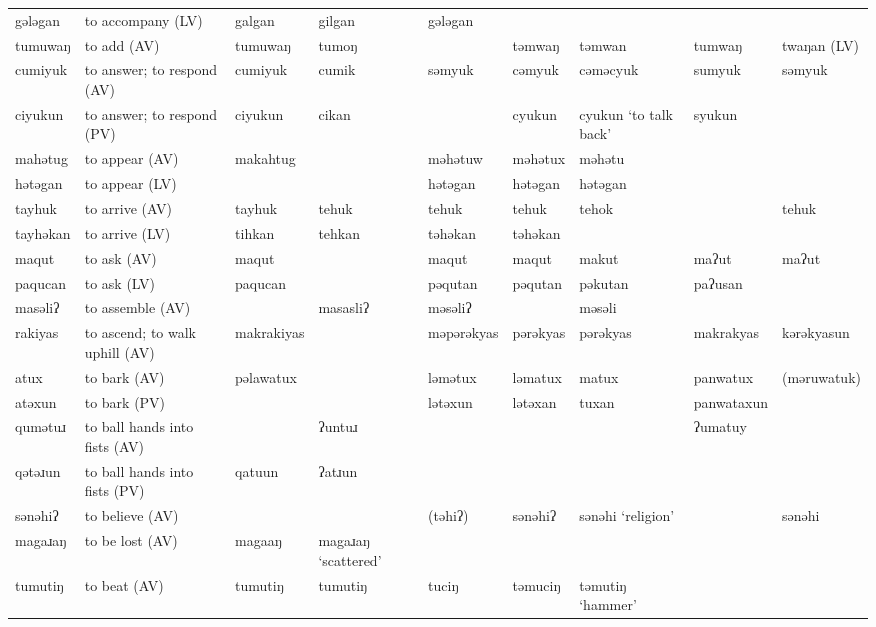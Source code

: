 \begin{landscape}
\begin{longtable}{*{9}{>{\raggedright\arraybackslash}p{}}}
\text{*}gələgan      & to accompany (LV) & galgan & gilgan & gələgan &  &  &  & \\
\text{*}tumuwaŋ      & to add (AV) & tumuwaŋ & tumoŋ &  & təmwaŋ & təmwan & tumwaŋ & twaŋan (LV)\\
\text{*}cumiyuk      & to answer; to respond (AV) & cumiyuk & cumik & səmyuk & cəmyuk & cəməcyuk & sumyuk & səmyuk\\
\text{*}ciyukun      & to answer; to respond (PV) & ciyukun & cikan &  & cyukun & cyukun \newline `to talk back' & syukun & \\
\text{*}mahətug      & to appear (AV) & makahtug &  & məhətuw & məhətux & məhətu &  & \\
\text{*}hətəgan      & to appear (LV) &  &  & hətəgan & hətəgan & hətəgan &  & \\
\text{*}tayhuk       & to arrive (AV) & tayhuk & tehuk & tehuk & tehuk & tehok &  & tehuk\\
\text{*}tayhəkan     & to arrive (LV) & tihkan & tehkan & təhəkan & təhəkan &  &  & \\
\text{*}maqut        & to ask (AV) & maqut &  & maqut & maqut & makut & maʔut & maʔut\\
\text{*}paqucan      & to ask (LV) & paqucan &  & pəqutan & pəqutan & pəkutan & paʔusan & \\
\text{*}masəliʔ      & to assemble (AV) &  & masasliʔ & məsəliʔ &  & məsəli &  & \\
\text{*}rakiyas     & to ascend; to walk uphill (AV) & makrakiyas &  & məpərəkyas & pərəkyas & pərəkyas & makrakyas & kərəkyasun\\
\text{*}atux        & to bark (AV) & pəlawatux &  & ləmətux & ləmatux & matux & panwatux & (məruwatuk)\\
\text{*}atəxun      & to bark (PV) &  &  & lətəxun & lətəxan & tuxan & panwataxun & \\
\text{*}qumətuɹ      & to ball hands into fists (AV) &  & ʔuntuɹ &  &  &  & ʔumatuy & \\
\text{*}qətəɹun      & to ball hands into fists (PV) & qatuun & ʔatɹun &  &  &  &  & \\
\text{*}sənəhiʔ      & to believe (AV) &  &  & (təhiʔ) & sənəhiʔ & sənəhi \newline `religion' &  & sənəhi\\
\text{*}magaɹaŋ      & to be lost (AV) & magaaŋ & magaɹaŋ `scattered' &  &  &  &  & \\
\text{*}tumutiŋ      & to beat (AV) & tumutiŋ & tumutiŋ & tuciŋ & təmuciŋ & təmutiŋ \newline `hammer' &  & \\

\end{longtable}
\end{landscape}
